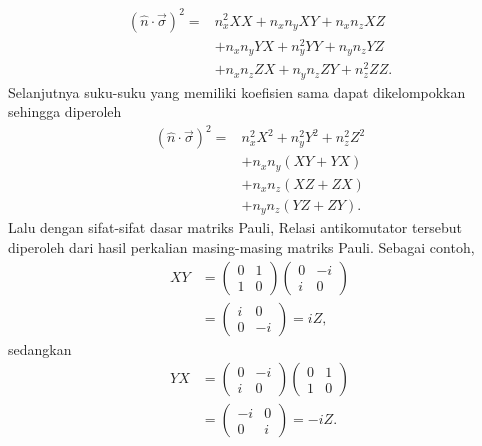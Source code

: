 \begin{equation}
\begin{aligned}
(\hat n\cdot\vec\sigma)^2
={}&
n_x^2XX
+n_xn_yXY
+n_xn_zXZ\\
&
+n_xn_yYX
+n_y^2YY
+n_yn_zYZ\\
&
+n_xn_zZX
+n_yn_zZY
+n_z^2ZZ.
\end{aligned}
\end{equation}
Selanjutnya suku-suku yang memiliki koefisien sama dapat dikelompokkan sehingga diperoleh
\begin{equation}
\begin{aligned}
(\hat n\cdot\vec\sigma)^2
={}&
n_x^2X^2
+n_y^2Y^2
+n_z^2Z^2\\
&
+n_xn_y(XY+YX)\\
&
+n_xn_z(XZ+ZX)\\
&
+n_yn_z(YZ+ZY).
\end{aligned}
\end{equation}
Lalu dengan sifat-sifat dasar matriks Pauli, Relasi antikomutator tersebut diperoleh dari hasil perkalian masing-masing matriks Pauli. Sebagai contoh,
\begin{equation}
\begin{aligned}
XY
&=
\begin{pmatrix}
0&1\\
1&0
\end{pmatrix}
\begin{pmatrix}
0&-i\\
i&0
\end{pmatrix}\\
&=
\begin{pmatrix}
i&0\\
0&-i
\end{pmatrix}
=iZ,
\end{aligned}
\end{equation}
sedangkan
\begin{equation}
\begin{aligned}
YX
&=
\begin{pmatrix}
0&-i\\
i&0
\end{pmatrix}
\begin{pmatrix}
0&1\\
1&0
\end{pmatrix}\\
&=
\begin{pmatrix}
-i&0\\
0&i
\end{pmatrix}
=-iZ.
\end{aligned}
\end{equation}
